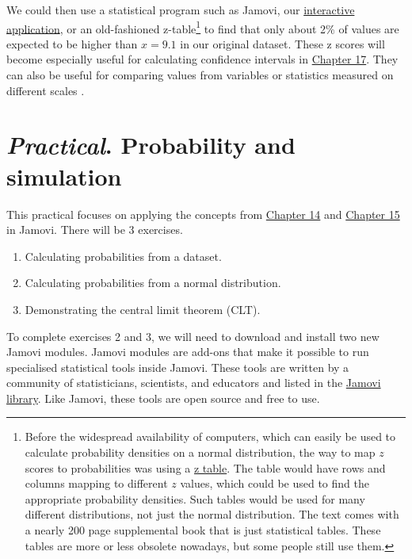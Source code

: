 \documentclass[
]{scrbook}
\providecommand{\tightlist}{%
  \setlength{\itemsep}{0pt}\setlength{\parskip}{0pt}}
\begin{document}
We could then use a statistical program such as Jamovi, our \href{https://bradduthie.shinyapps.io/zandp/}{interactive application}, or an old-fashioned z-table\footnote{Before the widespread availability of computers, which can easily be used to calculate probability densities on a normal distribution, the way to map \(z\) scores to probabilities was using a \href{https://www.z-table.com/}{z table}. The table would have rows and columns mapping to different \(z\) values, which could be used to find the appropriate probability densities. Such tables would be used for many different distributions, not just the normal distribution. The text \citet{Sokal1995} comes with a nearly 200 page supplemental book that is just statistical tables. These tables are more or less obsolete nowadays, but some people still use them.} to find that only about 2\% of values are expected to be higher than \(x = 9.1\) in our original dataset.
These z scores will become especially useful for calculating confidence intervals in \protect\hyperlink{Chapter_17}{Chapter 17}.
They can also be useful for comparing values from variables or statistics measured on different scales \citep{Sokal1995, Cheadle2003, Adams2016}.

\hypertarget{Chapter_16}{%
\chapter{\texorpdfstring{\emph{Practical}. Probability and simulation}{Practical. Probability and simulation}}\label{Chapter_16}}

This practical focuses on applying the concepts from \protect\hyperlink{Chapter_14}{Chapter 14} and \protect\hyperlink{Chapter_15}{Chapter 15} in Jamovi.
There will be 3 exercises.

\begin{enumerate}
\def\labelenumi{\arabic{enumi}.}
\tightlist
\item
  Calculating probabilities from a dataset.
\item
  Calculating probabilities from a normal distribution.
\item
  Demonstrating the central limit theorem (CLT).
\end{enumerate}

To complete exercises 2 and 3, we will need to download and install two new Jamovi modules.
Jamovi modules are add-ons that make it possible to run specialised statistical tools inside Jamovi.
These tools are written by a community of statisticians, scientists, and educators and listed in the \href{https://www.jamovi.org/library.html}{Jamovi library}.
Like Jamovi, these tools are open source and free to use.
\end{document}
